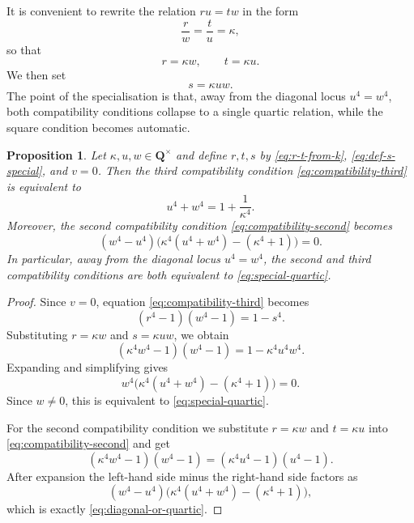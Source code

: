 \documentclass[11pt]{article}
\newtheorem{proposition}[theorem]{Proposition}
\newcommand{\Q}{\mathbf{Q}}
\begin{document}
It is convenient to rewrite the relation $ru=tw$ in the form
\begin{equation}\label{eq:def-k}
\frac{r}{w}=\frac{t}{u}=\kappa,
\end{equation}
so that
\begin{equation}\label{eq:r-t-from-k}
r=\kappa w,\qquad t=\kappa u.
\end{equation}
We then set
\begin{equation}\label{eq:def-s-special}
s=\kappa uw.
\end{equation}
The point of the specialisation is that, away from the diagonal locus $u^4=w^4$, both compatibility conditions collapse to a single quartic relation, while the square condition becomes automatic.

\begin{proposition}\label{prop:quartic-reduction}
Let $\kappa,u,w\in\Q^\times$ and define $r,t,s$ by \eqref{eq:r-t-from-k}, \eqref{eq:def-s-special}, and $v=0$. Then the third compatibility condition \eqref{eq:compatibility-third} is equivalent to
\begin{equation}\label{eq:special-quartic}
u^4+w^4=1+\frac{1}{\kappa^4}.
\end{equation}
Moreover, the second compatibility condition \eqref{eq:compatibility-second} becomes
\begin{equation}\label{eq:diagonal-or-quartic}
(w^4-u^4)\bigl(\kappa^4(u^4+w^4)-(\kappa^4+1)\bigr)=0.
\end{equation}
In particular, away from the diagonal locus $u^4=w^4$, the second and third compatibility conditions are both equivalent to \eqref{eq:special-quartic}.
\end{proposition}

\begin{proof}
Since $v=0$, equation \eqref{eq:compatibility-third} becomes
\[
(r^4-1)(w^4-1)=1-s^4.
\]
Substituting $r=\kappa w$ and $s=\kappa uw$, we obtain
\[
(\kappa^4w^4-1)(w^4-1)=1-\kappa^4u^4w^4.
\]
Expanding and simplifying gives
\[
w^4\bigl(\kappa^4(u^4+w^4)-(\kappa^4+1)\bigr)=0.
\]
Since $w\neq 0$, this is equivalent to \eqref{eq:special-quartic}.

For the second compatibility condition we substitute $r=\kappa w$ and $t=\kappa u$ into \eqref{eq:compatibility-second} and get
\[
(\kappa^4w^4-1)(w^4-1)=(\kappa^4u^4-1)(u^4-1).
\]
After expansion the left-hand side minus the right-hand side factors as
\[
(w^4-u^4)\bigl(\kappa^4(u^4+w^4)-(\kappa^4+1)\bigr),
\]
which is exactly \eqref{eq:diagonal-or-quartic}.
\end{proof}
\end{document}
